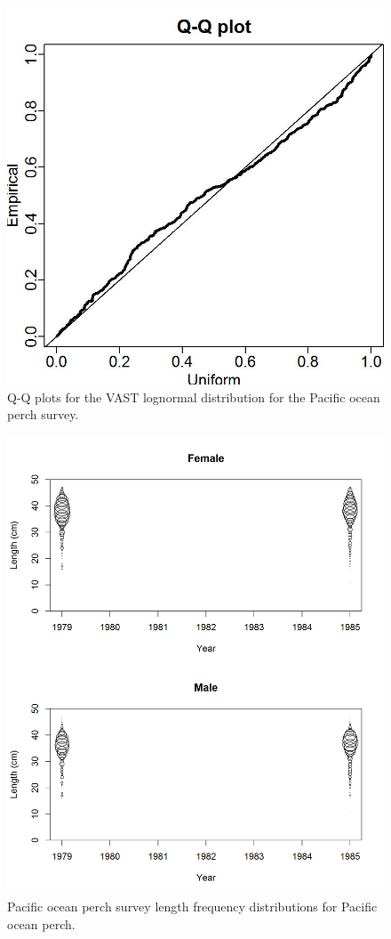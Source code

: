\documentclass[12pt,]{article}
\begin{document}
\begin{figure}
\centering
\includegraphics{Figures/Q-Q_plot_pop.jpg}
\caption{Q-Q plots for the VAST lognormal distribution for the Pacific
ocean perch survey. \label{fig:pop_qq}}
\end{figure}

\FloatBarrier

\begin{figure}
\centering
\includegraphics{Figures/POP_lengths.png}
\caption{Pacific ocean perch survey length frequency distributions for
Pacific ocean perch. \label{fig:POP_Length}}
\end{figure}
\end{document}
